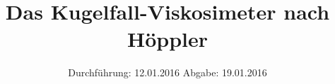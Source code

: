 

\subject{V107}
\title{Das Kugelfall-Viskosimeter nach Höppler}
\date{
  Durchführung: 12.01.2016
  \hspace{3em}
  Abgabe: 19.01.2016
}



\maketitle
\thispagestyle{empty}
\tableofcontents
\newpage







\printbibliography


